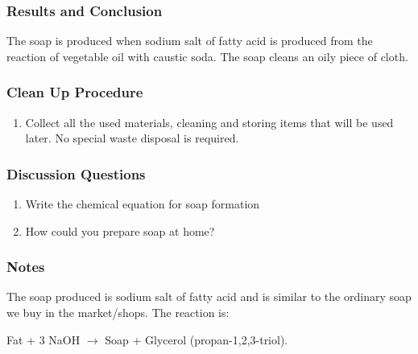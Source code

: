 \subsubsection*{Results and Conclusion}
The soap is produced when sodium salt of fatty acid is produced from the reaction of vegetable oil with caustic soda. The soap cleans an oily piece of cloth.

\subsubsection*{Clean Up Procedure}
\begin{enumerate}
\item{Collect all the used materials, cleaning and storing items that will be used later. No special waste disposal is required.}
\end{enumerate}

\subsubsection*{Discussion Questions}
\begin{enumerate}
\item{Write the chemical equation for soap formation}
\item{How could you prepare soap at home?}
\end{enumerate}

\subsubsection*{Notes}
The soap produced is sodium salt of fatty acid and is similar to the ordinary soap we buy in the market/shops.
The reaction is:

Fat  +  3 NaOH  $\longrightarrow$ Soap  +  Glycerol (propan-1,2,3-triol).

